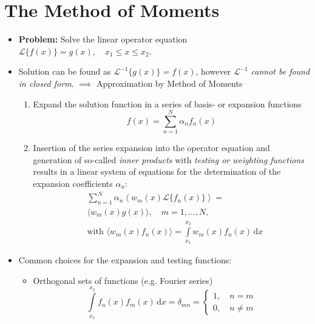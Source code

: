 \section{The Method of Moments}
\begin{itemize}
  \item \textbf{Problem:} Solve the linear operator equation $\mathcal{L}\{f(x)\} = g(x), \quad x_{1}\leq x \leq x_{2}$.
  \item Solution can be found as $\mathcal{L}^{-1}\{g(x)\} = f(x)$, however $\mathcal{L}^{-1}$ \textit{cannot be found in closed form}. $\implies$ Approximation by Method of Moments
        \begin{enumerate}
          \item Expand the solution function in a series of basis- or expansion functions
                \begin{equation*}
                  f(x) = \sum\limits_{n=1}^{N}\alpha_{n}f_{n}(x)
                \end{equation*}
          \item Insertion of the series expansion into the operator equation and generation of so-called \textit{inner products} with \textit{testing or weighting functions} results in a linear system of equations for the determination of the expansion coefficients $\alpha_{n}$:
                \begin{align*}
                  &\sum\limits_{n=1}^{N}\alpha_{n}\left\langle w_{m}(x)\mathcal{L}\{f_{n}(x)\}\right\rangle =\\
                  &\langle w_{m}(x)g(x)\rangle, \quad m=1,\dots,N,\\
                  &\text{with } \langle w_{m}(x)f_{n}(x)\rangle = \int\limits_{x_{1}}^{x_{2}}w_{m}(x)f_{n}(x)\,\mathrm{d}x
                \end{align*}
        \end{enumerate}
  \item Common choices for the expansion and testing functions:
        \begin{itemize}
                \item Orthogonal sets of functions (e.g. Fourier series)
                \begin{equation*}
                  \int\limits_{x_{1}}^{x_{2}}f_{n}(x)f_{m}(x)\,\mathrm{d}x = \delta_{mn} =
                  \begin{cases}
                    1, \quad n = m\\
                    0, \quad n \neq m
                  \end{cases}

\end{equation*}
\end{itemize}
\end{itemize}
